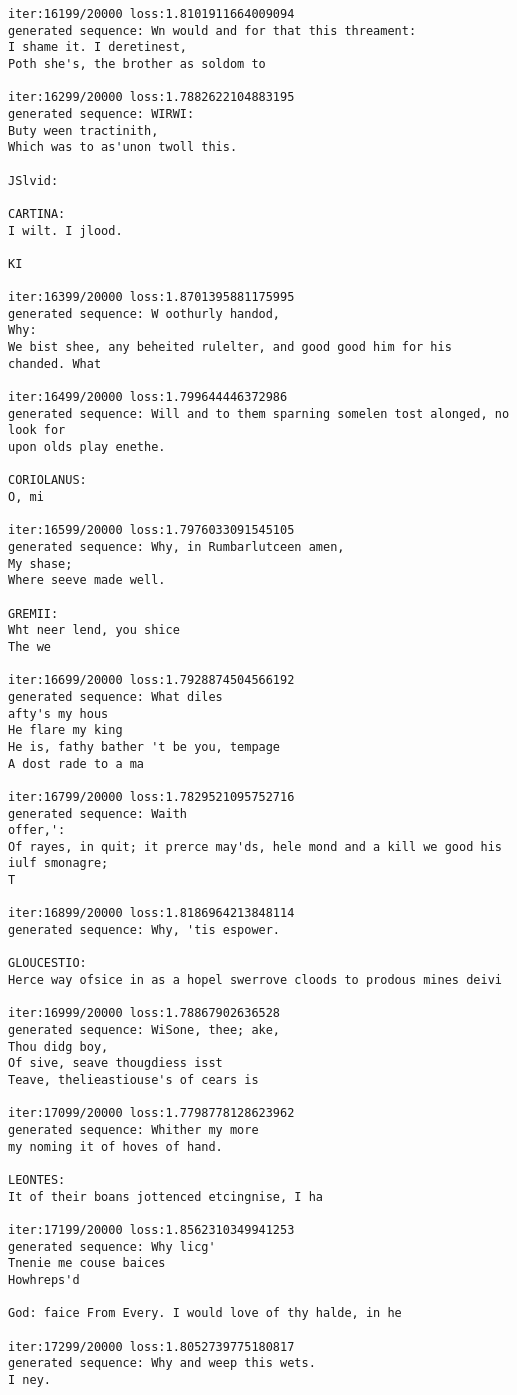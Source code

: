 \documentclass[11pt]{article}
\begin{document}
\begin{Verbatim}[commandchars=\\\{\}]
iter:16199/20000 loss:1.8101911664009094
generated sequence: Wn would and for that this threament:
I shame it. I deretinest,
Poth she's, the brother as soldom to 

iter:16299/20000 loss:1.7882622104883195
generated sequence: WIRWI:
Buty ween tractinith,
Which was to as'unon twoll this.

JSlvid:

CARTINA:
I wilt. I jlood.

KI

iter:16399/20000 loss:1.8701395881175995
generated sequence: W oothurly handod,
Why:
We bist shee, any beheited rulelter, and good good him for his chanded. What 

iter:16499/20000 loss:1.799644446372986
generated sequence: Will and to them sparning somelen tost alonged, no look for
upon olds play enethe.

CORIOLANUS:
O, mi

iter:16599/20000 loss:1.7976033091545105
generated sequence: Why, in Rumbarlutceen amen,
My shase;
Where seeve made well.

GREMII:
Wht neer lend, you shice
The we

iter:16699/20000 loss:1.7928874504566192
generated sequence: What diles
afty's my hous
He flare my king
He is, fathy bather 't be you, tempage
A dost rade to a ma

iter:16799/20000 loss:1.7829521095752716
generated sequence: Waith
offer,':
Of rayes, in quit; it prerce may'ds, hele mond and a kill we good his iulf smonagre;
T

iter:16899/20000 loss:1.8186964213848114
generated sequence: Why, 'tis espower.

GLOUCESTIO:
Herce way ofsice in as a hopel swerrove cloods to prodous mines deivi

iter:16999/20000 loss:1.78867902636528
generated sequence: WiSone, thee; ake,
Thou didg boy,
Of sive, seave thougdiess isst
Teave, thelieastiouse's of cears is 

iter:17099/20000 loss:1.7798778128623962
generated sequence: Whither my more
my noming it of hoves of hand.

LEONTES:
It of their boans jottenced etcingnise, I ha

iter:17199/20000 loss:1.8562310349941253
generated sequence: Why licg'
Tnenie me couse baices
Howhreps'd

God: faice From Every. I would love of thy halde, in he 

iter:17299/20000 loss:1.8052739775180817
generated sequence: Why and weep this wets.
I ney.


\end{Verbatim}
\end{document}

